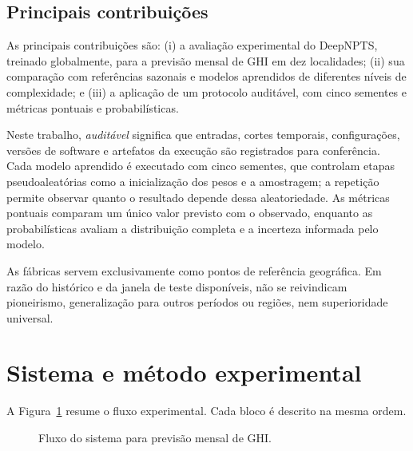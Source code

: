 \documentclass[12pt,a4paper,fleqn]{article}
\begin{document}
\subsection{Principais contribuições}

As principais contribuições são: (i) a avaliação experimental do DeepNPTS, treinado globalmente, para a previsão mensal de GHI em dez localidades; (ii) sua comparação com referências sazonais e modelos aprendidos de diferentes níveis de complexidade; e (iii) a aplicação de um protocolo auditável, com cinco sementes e métricas pontuais e probabilísticas.

Neste trabalho, \textit{auditável} significa que entradas, cortes temporais, configurações, versões de software e artefatos da execução são registrados para conferência. Cada modelo aprendido é executado com cinco sementes, que controlam etapas pseudoaleatórias como a inicialização dos pesos e a amostragem; a repetição permite observar quanto o resultado depende dessa aleatoriedade. As métricas pontuais comparam um único valor previsto com o observado, enquanto as probabilísticas avaliam a distribuição completa e a incerteza informada pelo modelo.

As fábricas servem exclusivamente como pontos de referência geográfica. Em razão do histórico e da janela de teste disponíveis, não se reivindicam pioneirismo, generalização para outros períodos ou regiões, nem superioridade universal.

\section{Sistema e método experimental}
\label{sec:metodo}

A Figura~\ref{fig:sistema} resume o fluxo experimental. Cada bloco é descrito na mesma ordem.

\begin{figure}[!ht]
\centering
{}
\caption{Fluxo do sistema para previsão mensal de GHI.}
\label{fig:sistema}
\end{figure}
\end{document}
